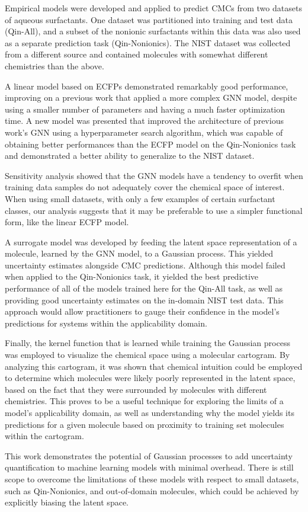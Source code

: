 Empirical models were developed and applied to predict CMCs from two datasets of
aqueous surfactants. One dataset was partitioned into training and test data
(Qin-All), and a subset of the nonionic surfactants within this data was also
used as a separate prediction task (Qin-Nonionics). The NIST dataset was
collected from a different source and contained molecules with somewhat
different chemistries than the above.

A linear model based on ECFPs demonstrated remarkably good performance,
improving on a previous work \cite{qinPredictingCriticalMicelle2021} that
applied a more complex GNN model, despite using a smaller number of parameters
and having a much faster optimization time. A new model was presented that
improved the architecture of previous work's GNN using a hyperparameter search
algorithm, which was capable of obtaining better performances than the ECFP
model on the Qin-Nonionics task and demonstrated a better ability to generalize
to the NIST dataset.

Sensitivity analysis showed that the GNN models have a tendency to overfit when
training data samples do not adequately cover the chemical space of interest.
When using small datasets, with only a few examples of certain surfactant
classes, our analysis suggests that it may be preferable to use a simpler
functional form, like the linear ECFP model.

A surrogate model was developed by feeding the latent space representation of a
molecule, learned by the GNN model, to a Gaussian process. This yielded
uncertainty estimates alongside CMC predictions. Although this model failed when
applied to the Qin-Nonionics task, it yielded the best predictive performance of
all of the models trained here for the Qin-All task, as well as providing good
uncertainty estimates on the in-domain NIST test data. This approach would allow
practitioners to gauge their confidence in the model's predictions for systems
within the applicability domain.

Finally, the kernel function that is learned while training the Gaussian process
was employed to visualize the chemical space using a molecular cartogram. By
analyzing this cartogram, it was shown that chemical intuition could be employed
to determine which molecules were likely poorly represented in the latent space,
based on the fact that they were surrounded by molecules with different
chemistries. This proves to be a useful technique for exploring the limits of a
model's applicability domain, as well as understanding why the model yields its
predictions for a given molecule based on proximity to training set molecules
within the cartogram.

This work demonstrates the potential of Gaussian processes to add uncertainty
quantification to machine learning models with minimal overhead. There is still
scope to overcome the limitations of these models with respect to small
datasets, such as Qin-Nonionics, and out-of-domain molecules, which could be
achieved by explicitly biasing the latent space.